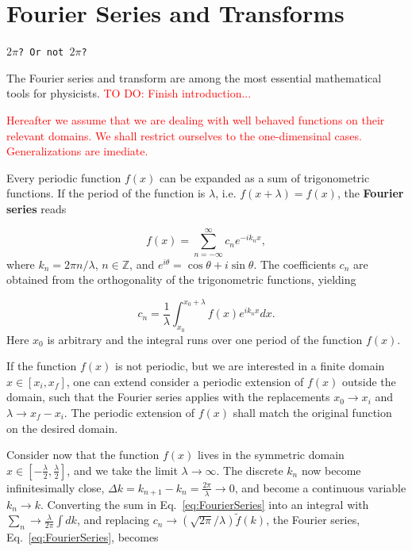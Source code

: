 \chapter{Fourier Series and Transforms}
\vspace*{-1cm}
\begin{flushright}
\texttt{$2\pi$? Or not $2\pi$?}
\end{flushright}

The Fourier series and transform are among the most essential mathematical tools for physicists. \textcolor{red}{TO DO: Finish introduction...}

\textcolor{red}{Hereafter we assume that we are dealing with well behaved functions on their relevant domains. We shall restrict ourselves to the one-dimensinal cases. Generalizations are imediate.}

Every periodic function $f(x)$ can be expanded as a sum of trigonometric functions. If the period of the function is $\lambda$, i.e. $f(x+\lambda) = f(x)$, the \textbf{Fourier series} reads

\begin{equation}
 f(x) = \sum_{n=-\infty}^{\infty} c_n e^{-i k_n x},
 \label{eq:FourierSeries}
\end{equation}
where $k_n = 2\pi n/\lambda$, $n \in \mathbb{Z}$, and $e^{i\theta} = \cos\theta+i\sin\theta$. The coefficients $c_n$ are obtained from the orthogonality of the trigonometric functions, yielding

\begin{equation}
 c_n = \dfrac{1}{\lambda} \int_{x_0}^{x_0+\lambda} f(x) e^{i k_n x} dx.
 \label{eq:FourierSeriesInv}
\end{equation}
Here $x_0$ is arbitrary and the integral runs over one period of the function $f(x)$.

If the function $f(x)$ is not periodic, but we are interested in a finite domain $x \in [x_i,x_f]$, one can extend consider a periodic extension of $f(x)$ outside the domain, such that the Fourier series applies with the replacements $x_0 \rightarrow x_i$ and $\lambda \rightarrow x_f-x_i$. The periodic extension of $f(x)$ shall match the original function on the desired domain.

Consider now that the function $f(x)$ lives in the symmetric domain $x \in [-\frac{\lambda}{2}, \frac{\lambda}{2}]$, and we take the limit $\lambda \rightarrow \infty$. The discrete $k_n$ now become infinitesimally close, $\Delta k = k_{n+1}-k_n = \frac{2\pi}{\lambda} \rightarrow 0$, and become a continuous variable $k_n \rightarrow k$. Converting the sum in Eq.~\eqref{eq:FourierSeries} into an integral with $\sum_n \rightarrow \frac{\lambda}{2\pi}\int dk$, and replacing $c_n \rightarrow (\sqrt{2\pi}/\lambda)\tilde{f}(k)$, the Fourier series, Eq.~\eqref{eq:FourierSeries}, becomes

